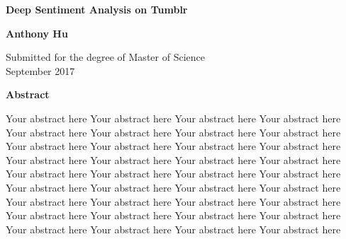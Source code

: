 \newpage
\thispagestyle{plain}
\begin{center}
  \textbf{\Large Deep Sentiment Analysis on Tumblr}

  \vspace*{1cm}
  \textbf{\large Anthony Hu}

  \vspace*{0.5cm}
  {\large Submitted for the degree of Master of Science\\ September 2017}

  \vspace*{1cm}
  \textbf{\large Abstract}
\end{center}
Your abstract here Your abstract here Your abstract here Your abstract here
Your abstract here Your abstract here Your abstract here Your abstract here
Your abstract here Your abstract here Your abstract here Your abstract here
Your abstract here Your abstract here Your abstract here Your abstract here
Your abstract here Your abstract here Your abstract here Your abstract here
Your abstract here Your abstract here Your abstract here Your abstract here
Your abstract here Your abstract here Your abstract here Your abstract here
Your abstract here Your abstract here Your abstract here Your abstract here
Your abstract here Your abstract here Your abstract here Your abstract here

\begin{spacing}{0.95}
\tableofcontents
\end{spacing}
\listoffigures
\listoftables
\clearpage











